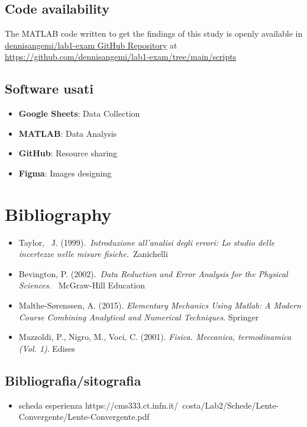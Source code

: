 \documentclass[11pt,a4paper]{article}
\begin{document}
\subsection{Code availability}
The MATLAB code written to get the findings of this study is openly available in \href{https://github.com/dennisangemi/lab1-exam/tree/main/scripts}{dennisangemi/lab1-exam GitHub Repository} at \href{https://github.com/dennisangemi/lab1-exam/tree/main/scripts}{https://github.com/dennisangemi/lab1-exam/tree/main/scripts}

\subsection{Software usati}
\begin{itemize}
    \item \textbf{Google Sheets}: Data Collection
    \item \textbf{MATLAB}: Data Analysis
    \item \textbf{GitHub}: Resource sharing
    \item \textbf{Figma}: Images designing
\end{itemize}

\section{Bibliography}
\begin{itemize}
    \item Taylor,~ J. (1999).~\emph{Introduzione all'analisi degli errori: Lo
  studio delle incertezze nelle misure fisiche.~}Zanichelli
    \item Bevington, P. (2002).~\emph{Data Reduction and Error Analysis for the Physical Sciences.~} McGraw-Hill Education ~
    \item Malthe-Sørenssen, A. (2015). \emph{Elementary Mechanics Using Matlab: A Modern Course Combining Analytical and Numerical Techniques}. Springer
    \item Mazzoldi, P., Nigro, M., Voci, C. (2001). \emph{Fisica. Meccanica, termodinamica (Vol. 1)}. Edises
\end{itemize}



\subsection{Bibliografia/sitografia}
\begin{itemize}
    \item scheda esperienza https://cms333.ct.infn.it/~costa/Lab2/Schede/Lente-Convergente/Lente-Convergente.pdf
\end{itemize}
\end{document}
